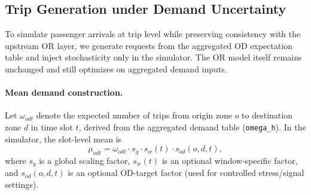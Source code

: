 


\subsection{Trip Generation under Demand Uncertainty}

To simulate passenger arrivals at trip level while preserving consistency with the upstream OR layer, we generate requests from the aggregated OD expectation table and inject stochasticity only in the simulator.  
The OR model itself remains unchanged and still optimizes on aggregated demand inputs.

\paragraph{Mean demand construction.}
Let $\omega_{odt}$ denote the expected number of trips from origin zone $o$ to destination zone $d$ in time slot $t$, derived from the aggregated demand table (\texttt{omega\_h}).  
In the simulator, the slot-level mean is
\begin{equation}
\mu_{odt} = \omega_{odt} \cdot s_g \cdot s_w(t) \cdot s_{od}(o,d,t),
\end{equation}
where $s_g$ is a global scaling factor, $s_w(t)$ is an optional window-specific factor, and $s_{od}(o,d,t)$ is an optional OD-target factor (used for controlled stress/signal settings).

